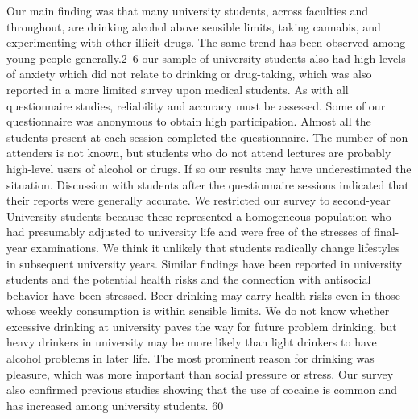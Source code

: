 \documentclass[14pt]{article}
\begin{document}
Our main finding was that many university students, across faculties and throughout, are drinking alcohol above sensible limits, taking cannabis, and experimenting with other illicit drugs. The same trend has been observed among young people generally.2–6 our sample of university students also had high levels of anxiety which did not relate to drinking or drug-taking, which was also reported in a more limited survey upon medical students. As with all questionnaire studies, reliability and accuracy must be assessed.  Some of our questionnaire was anonymous to obtain high participation. Almost all the students present at each session completed the questionnaire. The number of non-attenders is not known, but students who do not attend lectures are probably high-level users of alcohol or drugs. If so our results may have underestimated the situation. Discussion with students after the questionnaire sessions indicated that their reports were generally accurate. We restricted our survey to second-year University students because these represented a homogeneous population who had presumably adjusted to university life and were free of the stresses of final-year examinations. We think it unlikely that students radically change lifestyles in subsequent university years. Similar findings have been reported in university students and the potential health risks and the connection with antisocial behavior have been stressed. Beer drinking may carry health risks even in those whose weekly consumption is within sensible limits. We do not know whether excessive drinking at university paves the way for future problem drinking, but heavy drinkers in university may be more likely than light drinkers to have alcohol problems in later life. The most prominent reason for drinking was pleasure, which was more important than social pressure or stress. Our survey also confirmed previous studies showing that the use of cocaine is common and has increased among university students. 60%
\end{document}
